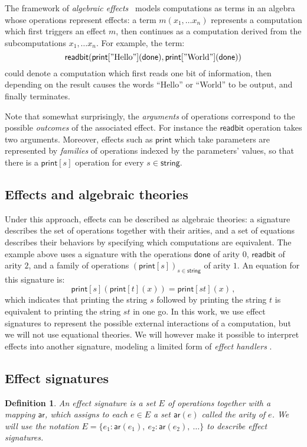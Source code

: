 \documentclass[draft,11pt]{report}
\newtheorem{definition}{Definition}
\newcommand{\kw}[1]{\ensuremath{ \mathsf{#1} }}
\begin{document}
The framework of \emph{algebraic effects}~\citep{effadq}
models computations as terms in an algebra
whose operations represent effects:
a term $m(x_1, \ldots x_n)$
represents a computation which first
triggers an effect $m$,
then continues as a computation derived from
the subcomputations $x_1, \ldots x_n$.
For example,
the term:
\[
    \kw{readbit}(
      \kw{print}["\text{Hello}"](\kw{done}),
      \kw{print}["\text{World}"](\kw{done}))
\]
could denote a computation which
first reads one bit of information,
then depending on the result
causes the words ``Hello'' or ``World'' to be output,
and finally terminates.

Note that somewhat surprisingly,
the \emph{arguments} of operations correspond to
the possible \emph{outcomes} of the associated effect.
For instance the $\kw{readbit}$ operation takes two arguments.
Moreover,
effects such as $\kw{print}$
which take parameters
are represented by \emph{families}
of operations indexed by the parameters' values,
so that there is a $\kw{print}[s]$
operation for every $s \in \kw{string}$.

\subsection{Effects and algebraic theories}

Under this approach,
effects can be described as algebraic theories:
a signature describes the set of operations together with their arities,
and a set of equations describes their behaviors
by specifying which computations are equivalent.
The example above uses a signature with the operations
$\kw{done}$ of arity $0$,
$\kw{readbit}$ of arity $2$,
and a family of operations $(\kw{print}[s])_{s \in \kw{string}}$
of arity $1$.
An equation for this signature is:
\[
    \kw{print}[s](\kw{print}[t](x)) =
    \kw{print}[st](x) \,,
\]
which indicates that
printing the string $s$ followed by
printing the string $t$ is equivalent to
printing the string $st$ in one go.
In this work,
we use effect signatures to represent
the possible external interactions
of a computation,
but we will not use equational theories.
We will however make it possible to interpret effects
into another signature,
modeling a limited form of
\emph{effect handlers} \citep{eff}.

\subsection{Effect signatures}

\begin{definition} \label{def:esig}
An \emph{effect signature}
is a set $E$ of operations
together with a mapping $\kw{ar}$,
which assigns to each $e \in E$ a set $\kw{ar}(e)$
called the \emph{arity} of $e$.
We will use the notation
$E = \{ e_1 : \kw{ar}(e_1), \: e_2 : \kw{ar}(e_2), \: \ldots \}$
to describe effect signatures.
\end{definition}
\end{document}
